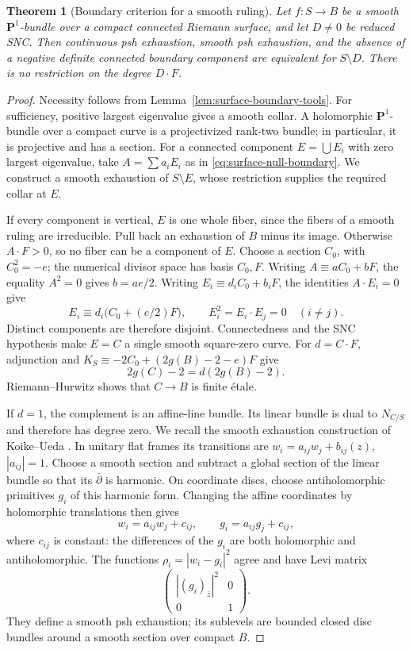 \documentclass[11pt]{amsart}
\newtheorem{theorem}{Theorem}[section]
\theoremstyle{definition}
\theoremstyle{remark}
\numberwithin{equation}{section}
\newcommand{\PP}{\mathbf P}
\begin{document}
\begin{theorem}[Boundary criterion for a smooth ruling]
\label{cor:ruled-all-degrees}
Let $f:S\to B$ be a smooth $\PP^1$-bundle over a compact connected
Riemann surface, and let $D\ne0$ be reduced SNC. Then continuous psh
exhaustion, smooth psh exhaustion, and the absence of a negative
definite connected boundary component are equivalent for $S\setminus D$.
There is no restriction on the degree $D\cdot F$.
\end{theorem}
\begin{proof}
Necessity follows from Lemma~\ref{lem:surface-boundary-tools}. For
sufficiency, positive largest eigenvalue gives a smooth collar. A
holomorphic $\PP^1$-bundle over a compact curve is a projectivized
rank-two bundle; in particular, it is projective and has a section.
For a
connected component $E=\bigcup E_i$ with zero largest eigenvalue, take
$A=\sum a_iE_i$ as in \eqref{eq:surface-null-boundary}. We construct a
smooth exhaustion of $S\setminus E$, whose restriction supplies the
required collar at $E$.

If every component is vertical, $E$ is one whole fiber, since the
fibers of a smooth ruling are irreducible. Pull back an exhaustion
of $B$ minus its image. Otherwise $A\cdot F>0$, so no fiber can be a
component of $E$. Choose a section $C_0$, with $C_0^2=-e$; the
numerical divisor space has basis $C_0,F$. Writing
$A\equiv aC_0+bF$, the equality $A^2=0$ gives $b=ae/2$.
Writing $E_i\equiv d_iC_0+b_iF$, the identities $A\cdot E_i=0$ give
\[
 E_i\equiv d_i\bigl(C_0+(e/2)F\bigr),\qquad
 E_i^2=E_i\cdot E_j=0\quad(i\ne j).
\]
Distinct components are therefore disjoint. Connectedness and the
SNC hypothesis make $E=C$ a single smooth square-zero curve. For
$d=C\cdot F$, adjunction and
$K_S\equiv-2C_0+(2g(B)-2-e)F$ give
\[
 2g(C)-2=d(2g(B)-2).
\]
Riemann--Hurwitz shows that $C\to B$ is finite \'etale.

If $d=1$, the complement is an affine-line bundle. Its linear bundle
is dual to $N_{C/S}$ and therefore has degree zero. We recall the smooth exhaustion construction of
Koike--Ueda \cite[Proposition~2.1]{KoikeUeda2025}. In unitary flat
frames its transitions are $w_i=a_{ij}w_j+b_{ij}(z)$, $|a_{ij}|=1$.
Choose a smooth section and subtract a global section of the linear
bundle so that its $\bar\partial$ is harmonic. On coordinate discs,
choose antiholomorphic primitives $g_i$ of this harmonic form.
Changing the affine coordinates by holomorphic translations then gives
\[
 w_i=a_{ij}w_j+c_{ij},\qquad
 g_i=a_{ij}g_j+c_{ij},
\]
where $c_{ij}$ is constant: the differences of the $g_i$ are both
holomorphic and antiholomorphic. The functions
$\rho_i=|w_i-g_i|^2$ agree and have Levi matrix
\[
 \begin{pmatrix}|(g_i)_{\bar z}|^2&0\\0&1\end{pmatrix}.
\]
They define a smooth psh exhaustion; its sublevels are bounded closed
disc bundles around a smooth section over compact $B$.


\end{proof}
\end{document}
